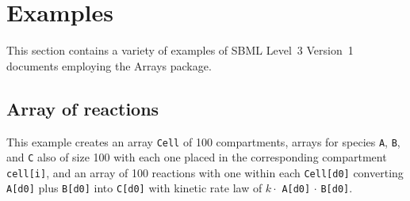 %
\section{Examples}
\label{examples}

This section contains a variety of examples of SBML Level~3 Version~1
documents employing the Arrays package.

\subsection{Array of reactions}

This example creates an array {\tt Cell} of 100 compartments, arrays for species {\tt A}, {\tt B}, and {\tt C} also of size 100 with each one placed in the corresponding compartment {\tt cell[i]}, and an array of 100 reactions with one within each {\tt Cell[d0]} converting {\tt A[d0]} plus {\tt B[d0]} into {\tt C[d0]} with kinetic rate law of $k \cdot$ {\tt A[d0]} $\cdot$ {\tt B[d0]}.

